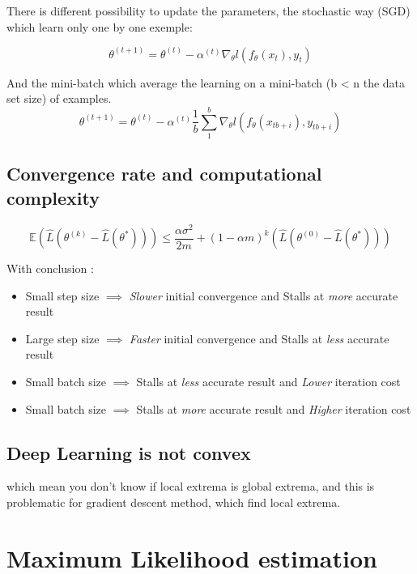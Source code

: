 		There is different possibility to update the parameters, the stochastic way (SGD) which learn only one by one exemple:

		\[
			\theta^{(t+1)} = \theta^{(t)} - \alpha^{(t)} \nabla_\theta l(f_\theta(x_{t}), y_{t})
		\]

		And the mini-batch which average the learning on a mini-batch (b < n the data set size) of examples.
		\[
			\theta^{(t+1)} = \theta^{(t)} - \alpha^{(t)} \frac{1}{b}\sum^b_1 \nabla_\theta l(f_\theta(x_{tb+i}), y_{tb+i})
		\]

	\subsection{Convergence rate and computational complexity}
		
		\[
			\mathbb{E}(\hat L(\theta^{(k)} - \hat L(\theta^*))) \leq \frac{\alpha \sigma^2}{2m}+ (1 -\alpha m )^k (\hat L(\theta^{(0)} - \hat L(\theta^*)))
		\]

		With conclusion : 
		\begin{itemize}
		 	\item Small step size $\implies$ \emph{Slower} initial convergence and Stalls at \emph{more} accurate result
			\item Large step size $\implies$ \emph{Faster} initial convergence and Stalls at \emph{less} accurate result
			\item Small batch size $\implies$ Stalls at \emph{less} accurate result and \emph{Lower} iteration cost
			\item  Small batch size $\implies$ Stalls at \emph{more} accurate result and \emph{Higher} iteration cost
		\end{itemize}

	\subsection{Deep Learning is not convex}
			which mean you don't know if local extrema is global extrema, and this is problematic for gradient descent method, which find local extrema.



\section{Maximum Likelihood estimation}


